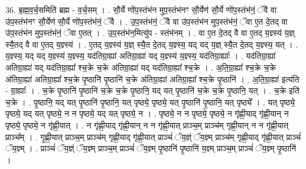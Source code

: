 \documentclass[17pt]{extarticle}
\begin{document}
36. ब्र॒ह्म॒व॒र्च॒समिति॑ ब्रह्म - व॒र्च॒सम् । . सौ॒र्ये णो॑प॒स्तंभ॑न मुप॒स्तंभ॑नꣳ सौ॒र्येण॑ सौ॒र्ये णो॑प॒स्तंभ॑नं॒ ॅवै वा उ॑प॒स्तंभ॑नꣳ सौ॒र्येण॑ सौ॒र्ये णो॑प॒स्तंभ॑नं॒ ॅवै । . उ॒प॒स्तंभ॑नं॒ ॅवै वा उ॑प॒स्तंभ॑न मुप॒स्तंभ॑नं॒ ॅवा ए॒त दे॒तद् वा उ॑प॒स्तंभ॑न मुप॒स्तंभ॑नं॒ ॅवा ए॒तत् । . उ॒प॒स्तंभ॑न॒मित्यु॑प - स्तंभ॑नम् । . वा ए॒त दे॒तद् वै वा ए॒तद् य॒ज्ञ्स्य॑ य॒ज्ञ् स्यै॒तद् वै वा ए॒तद् य॒ज्ञ्स्य॑ । . ए॒तद् य॒ज्ञ्स्य॑ य॒ज्ञ् स्यै॒त दे॒तद् य॒ज्ञ्स्य॒ यद् यद् य॒ज्ञ् स्यै॒त दे॒तद् य॒ज्ञ्स्य॒ यत् । . य॒ज्ञ्स्य॒ यद् यद् य॒ज्ञ्स्य॑ य॒ज्ञ्स्य॒ यद॑तिग्रा॒ह्या॑ अतिग्रा॒ह्या॑ यद् य॒ज्ञ्स्य॑ य॒ज्ञ्स्य॒ यद॑तिग्रा॒ह्याः᳚ । . यद॑तिग्रा॒ह्या॑ अतिग्रा॒ह्या॑ यद् यद॑तिग्रा॒ह्या᳚ श्च॒क्रे च॒क्रे अ॑तिग्रा॒ह्या॑ यद् यद॑तिग्रा॒ह्या᳚ श्च॒क्रे । . अ॒ति॒ग्रा॒ह्या᳚ श्च॒क्रे च॒क्रे अ॑तिग्रा॒ह्या॑ अतिग्रा॒ह्या᳚ श्च॒क्रे पृ॒ष्ठानि॑ पृ॒ष्ठानि॑ च॒क्रे अ॑तिग्रा॒ह्या॑ अतिग्रा॒ह्या᳚ श्च॒क्रे पृ॒ष्ठानि॑ । . अ॒ति॒ग्रा॒ह्या॑ इत्य॑ति - ग्रा॒ह्याः᳚ । . च॒क्रे पृ॒ष्ठानि॑ पृ॒ष्ठानि॑ च॒क्रे च॒क्रे पृ॒ष्ठानि॒ यद् यत् पृ॒ष्ठानि॑ च॒क्रे च॒क्रे पृ॒ष्ठानि॒ यत् । . च॒क्रे इति॑ च॒क्रे । . पृ॒ष्ठानि॒ यद् यत् पृ॒ष्ठानि॑ पृ॒ष्ठानि॒ यत् पृष्ठ्ये॒ पृष्ठ्ये॒ यत् पृ॒ष्ठानि॑ पृ॒ष्ठानि॒ यत् पृष्ठ्ये᳚ । . यत् पृष्ठ्ये॒ पृष्ठ्ये॒ यद् यत् पृष्ठ्ये॒ न न पृष्ठ्ये॒ यद् यत् पृष्ठ्ये॒ न । . पृष्ठ्ये॒ न न पृष्ठ्ये॒ पृष्ठ्ये॒ न गृ॑ह्णी॒याद् गृ॑ह्णी॒यान् न पृष्ठ्ये॒ पृष्ठ्ये॒ न गृ॑ह्णी॒यात् । . न गृ॑ह्णी॒याद् गृ॑ह्णी॒यान् न न गृ॑ह्णी॒यात् प्राञ्च॒म् प्राञ्च॑म् गृह्णी॒यान् न न गृ॑ह्णी॒यात् प्राञ्च᳚म् । . गृ॒ह्णी॒यात् प्राञ्च॒म् प्राञ्च॑म् गृह्णी॒याद् गृ॑ह्णी॒यात् प्राञ्चं॑ ॅय॒ज्ञ्ं ॅय॒ज्ञ्म् प्राञ्च॑म् गृह्णी॒याद् गृ॑ह्णी॒यात् प्राञ्चं॑ ॅय॒ज्ञ्म् । . प्राञ्चं॑ ॅय॒ज्ञ्ं ॅय॒ज्ञ्म् प्राञ्च॒म् प्राञ्चं॑ ॅय॒ज्ञ्म् पृ॒ष्ठानि॑ पृ॒ष्ठानि॑ य॒ज्ञ्म् प्राञ्च॒म् प्राञ्चं॑ ॅय॒ज्ञ्म् पृ॒ष्ठानि॑ । \newline
\end{document}
